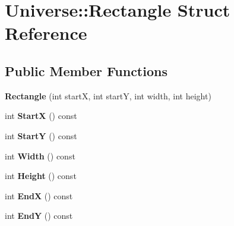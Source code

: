 \hypertarget{structUniverse_1_1Rectangle}{}\section{Universe\+:\+:Rectangle Struct Reference}
\label{structUniverse_1_1Rectangle}
\subsection*{Public Member Functions}
\begin{DoxyCompactItemize}
\item 
\hypertarget{structUniverse_1_1Rectangle_aac8dfe257cbe8124853409e1125b19e0}{}{\bfseries Rectangle} (int start\+X, int start\+Y, int width, int height)\label{structUniverse_1_1Rectangle_aac8dfe257cbe8124853409e1125b19e0}

\item 
\hypertarget{structUniverse_1_1Rectangle_a96518dac39517568beb3fcacf8673e51}{}int {\bfseries Start\+X} () const \label{structUniverse_1_1Rectangle_a96518dac39517568beb3fcacf8673e51}

\item 
\hypertarget{structUniverse_1_1Rectangle_a3c206e6a94bc31cfbd8e7be7128a1bfc}{}int {\bfseries Start\+Y} () const \label{structUniverse_1_1Rectangle_a3c206e6a94bc31cfbd8e7be7128a1bfc}

\item 
\hypertarget{structUniverse_1_1Rectangle_a3acd80287c918a1fb2845955c02c274d}{}int {\bfseries Width} () const \label{structUniverse_1_1Rectangle_a3acd80287c918a1fb2845955c02c274d}

\item 
\hypertarget{structUniverse_1_1Rectangle_a0a463f565d1262216e3f2647c1186092}{}int {\bfseries Height} () const \label{structUniverse_1_1Rectangle_a0a463f565d1262216e3f2647c1186092}

\item 
\hypertarget{structUniverse_1_1Rectangle_a48660f8fa7e60d68b9b69d5af92525ec}{}int {\bfseries End\+X} () const \label{structUniverse_1_1Rectangle_a48660f8fa7e60d68b9b69d5af92525ec}

\item 
\hypertarget{structUniverse_1_1Rectangle_a0efb95e61c4eae0f31eeaab4877b9e7c}{}int {\bfseries End\+Y} () const \label{structUniverse_1_1Rectangle_a0efb95e61c4eae0f31eeaab4877b9e7c}

\end{DoxyCompactItemize}
